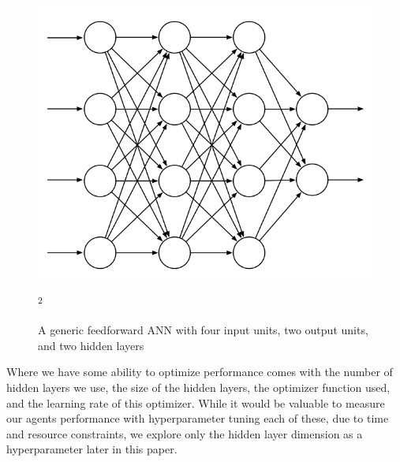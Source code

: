 \documentclass[conference]{IEEEtran}
\begin{document}
\begin{figure}[]
    \centering
    \includegraphics[scale=0.45]{figs/ann}
    \caption{A generic feedforward ANN with four input units, two output units, and two hidden layers}\textsuperscript{2}
    \label{fig:ann}
\end{figure}

Where we have some ability to optimize performance comes with the number of hidden layers we use, the size of the hidden layers, the optimizer function used, and the learning rate of this optimizer. While it would be valuable to measure our agents performance with hyperparameter tuning each of these, due to time and resource constraints, we explore only the hidden layer dimension as a hyperparameter later in this paper.
\end{document}
